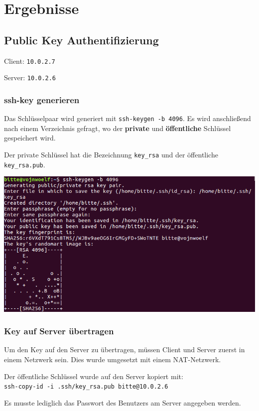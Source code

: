 \section{Ergebnisse}
\subsection{Public Key Authentifizierung}

Client: \verb|10.0.2.7|

Server: \verb|10.0.2.6|
\subsubsection{ssh-key generieren}
Das Schlüsselpaar wird generiert mit \verb|ssh-keygen -b 4096|.
Es wird anschließend nach einem Verzeichnis gefragt, wo der \textbf{private} und \textbf{öffentliche} Schlüssel gespeichert wird.

Der private Schlüssel hat die Bezeichnung \verb|key_rsa| und der öffentliche \verb|key_rsa.pub|.

\begin{minipage}{\linewidth}
	\centering
	\includegraphics[width=0.8\linewidth]{images/generate_key}
\end{minipage}


\subsubsection{Key auf Server übertragen}
Um den Key auf den Server zu übertragen, müssen Client und Server zuerst in einem Netzwerk sein. Dies wurde umgesetzt mit einem NAT-Netzwerk.

Der öffentliche Schlüssel wurde auf den Server kopiert mit:\\\verb|ssh-copy-id -i .ssh/key_rsa.pub bitte@10.0.2.6|

Es musste lediglich das Passwort des Benutzers am Server angegeben werden.

